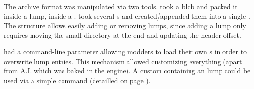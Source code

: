 \par
{}
\par
{}\\
\par
{}
\par
The archive format was manipulated via two tools.  took a blob and packed it inside a lump, inside a .  took several s and created/appended them into a single . The structure allows easily adding or removing lumps, since adding a lump only requires moving the small directory at the end and updating the header offset.\\
\par
{} had a command-line parameter allowing modders to load their own s in order to overwrite  lump entries. This mechanism allowed customizing everything (apart from A.I. which was baked in the engine). A custom  containing an  lump could be used via a simple  command (detailled on page \pageref{wad_detailled}).




